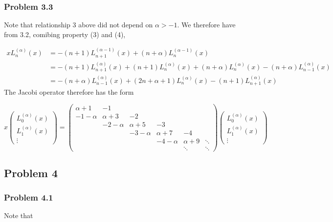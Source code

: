 \documentclass[12pt,landscape]{article}
\begin{document}
{\subsubsection{Problem 3.3}
Note that relationship 3 above did not depend on $\alpha >-1$.  We therefore have from 3.2, comibing property (3) and (4),


\begin{align*}
x L_n^{(\alpha)}(x) &= -(n+1)L_{n+1}^{(\alpha-1)}(x) +(n+\alpha)L_n^{(\alpha-1)}(x) \\
  &= -(n+1)L_{n+1}^{(\alpha)}(x) + (n+1)L_{n}^{(\alpha)}(x) +(n+\alpha)L_{n}^{(\alpha)}(x) - (n+\alpha)L_{n-1}^{(\alpha)}(x) \\
  &= - (n+\alpha)L_{n-1}^{(\alpha)}(x) + (2n+\alpha+1) L_n^{(\alpha)}(x) -(n+1)L_{n+1}^{(\alpha)}(x)
\end{align*}
The Jacobi operator therefore has the form

\[
x \begin{pmatrix} L_0^{(\alpha)}(x) \\
            L_1^{(\alpha)}(x) \\
                \vdots
                \end{pmatrix} = \begin{pmatrix} \alpha+1 &-1 \\
                                                -1-\alpha & \alpha+3 & -2 \\
                                                   & -2-\alpha & \alpha+5 &-3 \\                  &       & -3-\alpha & \alpha+7 &-4 \\
                                                      &&   & -4-\alpha & \alpha+9 &\ddots \\
                                                      &&&&\ddots & \ddots
                                                    \end{pmatrix} \begin{pmatrix} L_0^{(\alpha)}(x) \\
            L_1^{(\alpha)}(x) \\
                \vdots
                \end{pmatrix}
\]
\subsection{Problem 4}
\subsubsection{Problem 4.1}
Note that

}
\end{document}
